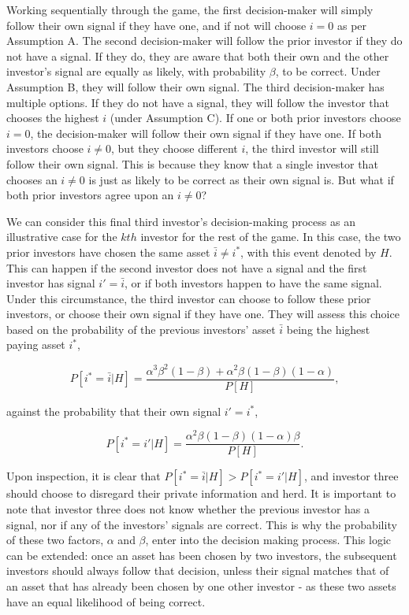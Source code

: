 \documentclass[12pt]{article}
\numberwithin{table}{section}   %
\begin{document}
Working sequentially through the game, the first decision-maker will simply follow their own signal if they have one, and if not will choose $i=0$ as per Assumption A. The second decision-maker will follow the prior investor if they do not have a signal. If they do, they are aware that both their own and the other investor’s signal are equally as likely, with probability $\beta$, to be correct. Under Assumption B, they will follow their own signal. The third decision-maker has multiple options. If they do not have a signal, they will follow the investor that chooses the highest $i$ (under Assumption C). If one or both prior investors choose $i=0$, the decision-maker will follow their own signal if they have one. If both investors choose $i\neq0$, but they choose different $i$, the third investor will still follow their own signal. This is because they know that a single investor that chooses an $i\neq0$ is just as likely to be correct as their own signal is. But what if both prior investors agree upon an $i\neq0$?

We can consider this final third investor’s decision-making process as an illustrative case for the $kth$ investor for the rest of the game. In this case, the two prior investors have chosen the same asset $\bar{i}\neq{i^*}$, with this event denoted by $H$. This can happen if the second investor does not have a signal and the first investor has signal $i'=\bar{i}$, or if both investors happen to have the same signal. Under this circumstance, the third investor can choose to follow these prior investors, or choose their own signal if they have one. They will assess this choice based on the probability of the previous investors’ asset $\bar{i}$ being the highest paying asset $i^*$,

$$
P[i^*=\bar{i}|H]=\frac{\alpha^3\beta^2(1-\beta)+\alpha^2\beta(1-\beta)(1-\alpha)}{P[H]},
$$

against the probability that their own signal $i'=i^*$,

$$
P[i^*=i'|H]=\frac{\alpha^2\beta(1-\beta)(1-\alpha)\beta}{P[H]}.
$$

Upon inspection, it is clear that $P[i^*=\bar{i}|H]>P[i^*=i'|H]$, and investor three should choose to disregard their private information and herd. It is important to note that investor three does not know whether the previous investor has a signal, nor if any of the investors’ signals are correct. This is why the probability of these two factors, $\alpha$ and $\beta$, enter into the decision making process. This logic can be extended: once an asset has been chosen by two investors, the subsequent investors should always follow that decision, unless their signal matches that of an asset that has already been chosen by one other investor - as these two assets have an equal likelihood of being correct.
\end{document}
